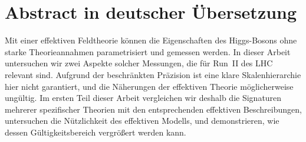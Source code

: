 


\chapter*{Abstract in deutscher \"{U}bersetzung}





Mit einer effektiven Feldtheorie k\"onnen die Eigenschaften des
Higgs-Bosons ohne starke Theorieannahmen parametrisiert und gemessen
werden. In dieser Arbeit untersuchen wir zwei Aspekte solcher
Messungen, die f\"ur Run~II des LHC relevant sind. Aufgrund der
beschr\"ankten Pr\"azision ist eine klare Skalenhierarchie hier nicht
garantiert, und die N\"aherungen der effektiven Theorie
m\"oglicherweise ung\"ultig. Im ersten Teil dieser Arbeit vergleichen
wir deshalb die Signaturen mehrerer spezifischer Theorien mit den
entsprechenden effektiven Beschreibungen, untersuchen die
N\"utzlichkeit des effektiven Modells, und demonstrieren, wie dessen
G\"ultigkeitsbereich vergr\"o\ss{}ert werden kann.

